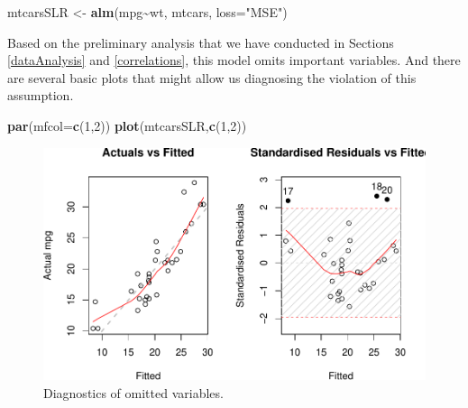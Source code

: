 \documentclass[
]{book}
\newenvironment{Shaded}{\begin{snugshade}}{\end{snugshade}}
\newcommand{\AttributeTok}[1]{\textcolor[rgb]{0.13,0.29,0.53}{#1}}
\newcommand{\DecValTok}[1]{\textcolor[rgb]{0.00,0.00,0.81}{#1}}
\newcommand{\FunctionTok}[1]{\textcolor[rgb]{0.13,0.29,0.53}{\textbf{#1}}}
\newcommand{\NormalTok}[1]{#1}
\newcommand{\OtherTok}[1]{\textcolor[rgb]{0.56,0.35,0.01}{#1}}
\newcommand{\SpecialCharTok}[1]{\textcolor[rgb]{0.81,0.36,0.00}{\textbf{#1}}}
\newcommand{\StringTok}[1]{\textcolor[rgb]{0.31,0.60,0.02}{#1}}
\theoremstyle{definition}
\theoremstyle{definition}
\theoremstyle{definition}
\theoremstyle{definition}
\theoremstyle{remark}
\begin{document}
\begin{Shaded}
\begin{Highlighting}[]
\NormalTok{mtcarsSLR }\OtherTok{\textless{}{-}} \FunctionTok{alm}\NormalTok{(mpg}\SpecialCharTok{\textasciitilde{}}\NormalTok{wt, mtcars, }\AttributeTok{loss=}\StringTok{"MSE"}\NormalTok{)}
\end{Highlighting}
\end{Shaded}

Based on the preliminary analysis that we have conducted in Sections \ref{dataAnalysis} and \ref{correlations}, this model omits important variables. And there are several basic plots that might allow us diagnosing the violation of this assumption.

\begin{Shaded}
\begin{Highlighting}[]
\FunctionTok{par}\NormalTok{(}\AttributeTok{mfcol=}\FunctionTok{c}\NormalTok{(}\DecValTok{1}\NormalTok{,}\DecValTok{2}\NormalTok{))}
\FunctionTok{plot}\NormalTok{(mtcarsSLR,}\FunctionTok{c}\NormalTok{(}\DecValTok{1}\NormalTok{,}\DecValTok{2}\NormalTok{))}
\end{Highlighting}
\end{Shaded}

\begin{figure}
\centering
\includegraphics{Svetunkov---Statistics-for-Business-Analytics_files/figure-latex/diagnostics01-1.pdf}
\caption{\label{fig:diagnostics01}Diagnostics of omitted variables.}
\end{figure}
\end{document}
